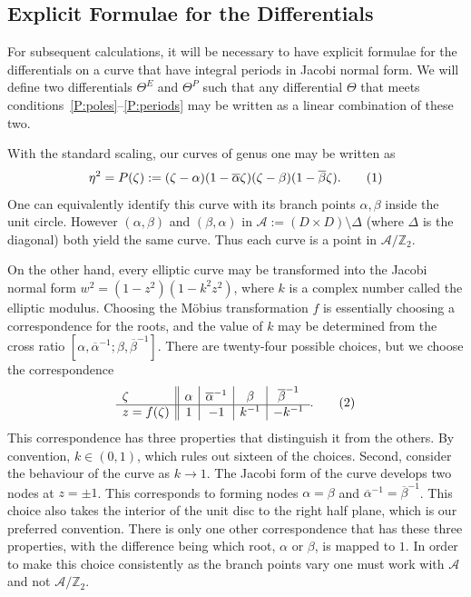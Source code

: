 \documentclass{article}
\numberwithin{equation}{section}
\numberwithin{figure}{section}
\newcommand{\labelthis}[1]{\addtocounter{equation}{1}\tag{\theequation}\label{#1}}
\renewcommand*{\bar}{\overline}
\newcommand{\cji}[1]{\overline{#1}^{-1}}
\begin{document}
\subsection{Explicit Formulae for the Differentials}\label{sub:Differentials}
For subsequent calculations, it will be necessary to have explicit formulae for the differentials on a curve that have integral periods in Jacobi normal form. We will define two differentials $\Theta^E$ and $\Theta^P$ such that any differential $\Theta$ that meets conditions~\ref{P:poles}--\ref{P:periods} may be written as a linear combination of these two.

With the standard scaling, our curves of genus one may be written as
\[
\eta^2 = P(\zeta) := (\zeta-\alpha)(1-\bar{\alpha}\zeta)(\zeta-\beta)(1-\bar{\beta}\zeta).
\labelthis{eqn:genus one curve}
\]
One can equivalently identify this curve with its branch points $\alpha,\beta$ inside the unit circle. However $(\alpha, \beta)$ and $(\beta,\alpha)$ in $\mathcal{A} := (D \times D) \setminus \Delta$ (where $\Delta$ is the diagonal) both yield the same curve. Thus each curve is a point in $\mathcal{A}/\mathbb{Z}_2$. 

On the other hand, every elliptic curve may be transformed into the Jacobi normal form $w^2 = (1-z^2)(1-k^2z^2)$, where $k$ is a complex number called the elliptic modulus. 
Choosing the M\"obius transformation $f$ is essentially choosing a correspondence for the roots, and the value of $k$ may be determined from the cross ratio $[\alpha,\cji{\alpha};\beta,\cji{\beta}]$.
There are twenty-four possible choices, but we choose the correspondence
\[
  \begin{array}{ l||c|c|c|c}
    \zeta & \alpha & \cji{\alpha} & \beta & \cji{\beta} \\
    \hline
    z = f(\zeta) & 1 & -1 & k^{-1} & -k^{-1}
  \end{array}.
  \labelthis{eqn:choice f}
\]
This correspondence has three properties that distinguish it from the others. By convention, $k \in (0,1)$, which rules out sixteen of the choices. Second, consider the behaviour of the curve as $k\to 1$. The Jacobi form of the curve develops two nodes at $z=\pm 1$. This corresponds to forming nodes $\alpha=\beta$ and $\cji{\alpha} = \cji{\beta}$. This choice also takes the interior of the unit disc to the right half plane, which is our preferred convention. There is only one other correspondence that has these three properties, with the difference being which root, $\alpha$ or $\beta$, is mapped to $1$. In order to make this choice consistently as the branch points vary one must work with $\mathcal{A}$ and not $\mathcal{A}/\mathbb{Z}_2$.
\end{document}
